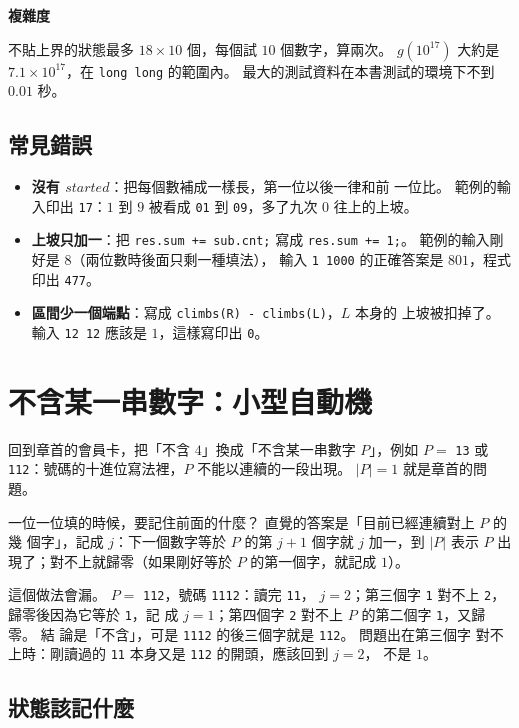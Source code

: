 \textbf{複雜度}

不貼上界的狀態最多 $18 \times 10$ 個，每個試 $10$ 個數字，算兩次。
$g(10^{17})$ 大約是 $7.1 \times 10^{17}$，在 \texttt{long long} 的範圍內。 最大的測試資料在本書測試的環境下不到 $0.01$ 秒。

\subsection{常見錯誤}

\begin{itemize}
\item \textbf{沒有 $\mathit{started}$}：把每個數補成一樣長，第一位以後一律和前
一位比。 範例的輸入印出 \texttt{17}：$1$ 到 $9$ 被看成 \texttt{01} 到
\texttt{09}，多了九次 $0$ 往上的上坡。
\item \textbf{上坡只加一}：把 \texttt{res.sum += sub.cnt;} 寫成
\texttt{res.sum += 1;}。 範例的輸入剛好是 $8$（兩位數時後面只剩一種填法），
輸入 \texttt{1 1000} 的正確答案是 $801$，程式印出 \texttt{477}。
\item \textbf{區間少一個端點}：寫成 \texttt{climbs(R) - climbs(L)}，$L$ 本身的
上坡被扣掉了。 輸入 \texttt{12 12} 應該是 $1$，這樣寫印出 \texttt{0}。
\end{itemize}

\section{不含某一串數字：小型自動機}
\label{sec:dg-automaton}

回到章首的會員卡，把「不含 $4$」換成「不含某一串數字 $P$」，例如 $P =$
\texttt{13} 或 \texttt{112}：號碼的十進位寫法裡，$P$ 不能以連續的一段出現。
$|P| = 1$ 就是章首的問題。

一位一位填的時候，要記住前面的什麼？ 直覺的答案是「目前已經連續對上 $P$ 的幾
個字」，記成 $j$：下一個數字等於 $P$ 的第 $j + 1$ 個字就 $j$ 加一，到 $|P|$
表示 $P$ 出現了；對不上就歸零（如果剛好等於 $P$ 的第一個字，就記成 $1$）。

這個做法會漏。 $P =$ \texttt{112}，號碼 \texttt{1112}：讀完 \texttt{11}，
$j = 2$；第三個字 \texttt{1} 對不上 \texttt{2}，歸零後因為它等於 \texttt{1}，記
成 $j = 1$；第四個字 \texttt{2} 對不上 $P$ 的第二個字 \texttt{1}，又歸零。 結
論是「不含」，可是 \texttt{1112} 的後三個字就是 \texttt{112}。 問題出在第三個字
對不上時：剛讀過的 \texttt{11} 本身又是 \texttt{112} 的開頭，應該回到 $j = 2$，
不是 $1$。

\subsection{狀態該記什麼}

